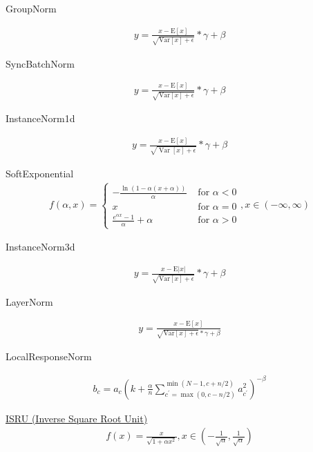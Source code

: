 GroupNorm

\begin{align}
  y=\frac{x-\mathrm{E}[x]}{\sqrt{\mathrm{Var}[x]+\epsilon}} * \gamma+\beta
\end{align}

SyncBatchNorm

\begin{align}
  y=\frac{x-\mathrm{E}[x]}{\sqrt{\mathrm{Var}[x]+\epsilon}} * \gamma+\beta
\end{align}

InstanceNorm1d

\begin{align}
  y=\frac{x-\mathrm{E}[x]}{\sqrt{\operatorname{Var}[x]+\epsilon}} * \gamma+\beta
\end{align}

SoftExponential
\begin{align}
  f(\alpha, x)=\left\{\begin{array}{ll}
{-\frac{\ln (1-\alpha(x+\alpha))}{\alpha}} & {\text { for } \alpha<0} \\
{x} & {\text { for } \alpha=0} \\
{\frac{e^{\alpha x}-1}{\alpha}+\alpha} & {\text { for } \alpha>0}
\end{array}\right., x\in (-\infty, \infty)
\end{align}

InstanceNorm3d

\begin{align}
  y=\frac{x-\mathrm{E}|x|}{\sqrt{\mathrm{Var}[x]+\epsilon}} * \gamma+\beta
\end{align}

LayerNorm

\begin{align}
  y=\frac{x-\mathrm{E}[x]}{\sqrt{\mathrm{Var}[x]+\epsilon} * \gamma+\beta}
\end{align}

LocalResponseNorm

\begin{align}
  b_{c}=a_{c}\left(k+\frac{\alpha}{n} \sum_{c^{\prime}=\max (0, c-n / 2)}^{\min (N-1, c+n / 2)} a_{c^{\prime}}^{2}\right)^{-\beta}
\end{align}

\href{http://www.gabormelli.com/RKB/Inverse_Square_Root_Unit_(ISRU)_Activation_Function}{ISRU (Inverse Square Root Unit)} \cite{BradCarlile2017}
\begin{align}
  f(x)=\frac{x}{\sqrt{1+\alpha x^{2}}}, x\in \left(-\frac{1}{\sqrt{\alpha}}, \frac{1}{\sqrt{\alpha}}\right)
\end{align}

